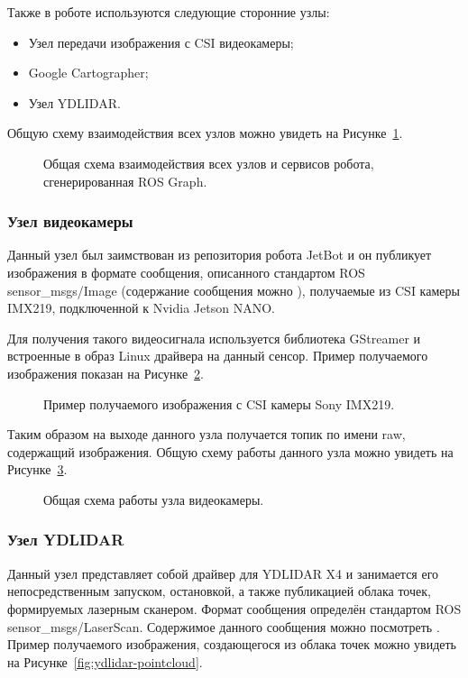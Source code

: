 Также в роботе используются следующие сторонние узлы:
\begin{itemize}
\item Узел передачи изображения с CSI видеокамеры;
\item Google Cartographer;
\item Узел YDLIDAR.
\end{itemize}


Общую схему взаимодействия всех узлов можно увидеть на Рисунке~\ref{fig:rosgraph}.

\begin{figure}[ht]
  \caption{Общая схема взаимодействия всех узлов и сервисов робота, сгенерированная ROS Graph.}\label{fig:rosgraph}
\end{figure}

\subsubsection{Узел видеокамеры}
Данный узел был заимствован из репозитория робота JetBot и он публикует изображения в формате сообщения, описанного стандартом ROS sensor\_msgs/Image (содержание сообщения можно ), получаемые из CSI камеры IMX219, подключенной к Nvidia Jetson NANO. 

Для получения такого видеосигнала используется библиотека GStreamer и встроенные в образ Linux драйвера на данный сенсор. Пример получаемого изображения показан на Рисунке~\ref{fig:robot-camera-test}.

\begin{figure}[ht]
  \caption{Пример получаемого изображения с CSI камеры Sony IMX219.}\label{fig:robot-camera-test}
\end{figure}

Таким образом на выходе данного узла получается топик по имени raw, содержащий изображения. Общую схему работы данного узла можно увидеть на Рисунке~\ref{fig:node-videocamera}.

\begin{figure}[ht]
  \caption{Общая схема работы узла видеокамеры.}\label{fig:node-videocamera}
\end{figure}

\subsubsection{Узел YDLIDAR}
Данный узел представляет собой драйвер для YDLIDAR X4 и занимается его непосредственным запуском, остановкой, а также публикацией облака точек, формируемых лазерным сканером. Формат сообщения определён стандартом ROS sensor\_msgs/LaserScan.  Содержимое данного сообщения можно посмотреть . Пример получаемого изображения, создающегося из облака точек можно увидеть на Рисунке~\ref{fig:ydlidar-pointcloud}. 

